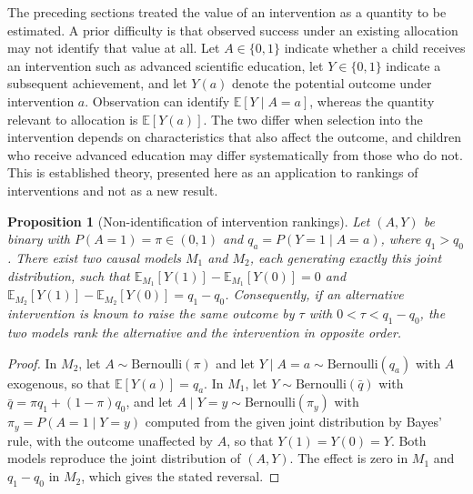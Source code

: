 \documentclass[11pt]{article}
\newtheorem{proposition}{Proposition}
\theoremstyle{definition}
\theoremstyle{remark}
\newcommand{\E}{\mathbb{E}}
\begin{document}
The preceding sections treated the value of an intervention as a quantity to be estimated. A prior difficulty is that observed success under an existing allocation may not identify that value at all. Let $A\in\{0,1\}$ indicate whether a child receives an intervention such as advanced scientific education, let $Y\in\{0,1\}$ indicate a subsequent achievement, and let $Y(a)$ denote the potential outcome under intervention $a$. Observation can identify $\E[Y\mid A=a]$, whereas the quantity relevant to allocation is $\E[Y(a)]$. The two differ when selection into the intervention depends on characteristics that also affect the outcome, and children who receive advanced education may differ systematically from those who do not. This is established theory, presented here as an application to rankings of interventions and not as a new result.

\begin{proposition}[Non-identification of intervention rankings]
\label{prop:ident}
Let $(A,Y)$ be binary with $P(A=1)=\pi\in(0,1)$ and $q_a=P(Y=1\mid A=a)$, where $q_1>q_0$. There exist two causal models $M_1$ and $M_2$, each generating exactly this joint distribution, such that $\E_{M_1}[Y(1)]-\E_{M_1}[Y(0)]=0$ and $\E_{M_2}[Y(1)]-\E_{M_2}[Y(0)]=q_1-q_0$. Consequently, if an alternative intervention is known to raise the same outcome by $\tau$ with $0<\tau<q_1-q_0$, the two models rank the alternative and the intervention in opposite order.
\end{proposition}

\begin{proof}
In $M_2$, let $A\sim\mathrm{Bernoulli}(\pi)$ and let $Y\mid A=a\sim\mathrm{Bernoulli}(q_a)$ with $A$ exogenous, so that $\E[Y(a)]=q_a$. In $M_1$, let $Y\sim\mathrm{Bernoulli}(\bar q)$ with $\bar q=\pi q_1+(1-\pi)q_0$, and let $A\mid Y=y\sim\mathrm{Bernoulli}(\pi_y)$ with $\pi_y=P(A=1\mid Y=y)$ computed from the given joint distribution by Bayes' rule, with the outcome unaffected by $A$, so that $Y(1)=Y(0)=Y$. Both models reproduce the joint distribution of $(A,Y)$. The effect is zero in $M_1$ and $q_1-q_0$ in $M_2$, which gives the stated reversal.
\end{proof}
\end{document}
